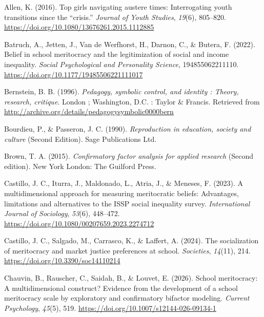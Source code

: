\documentclass[
  11pt,
]{article}
\newlength{\cslhangindent}
\newenvironment{CSLReferences}[2] %
 {\begin{list}{}{%
  \setlength{\itemindent}{0pt}
  \setlength{\leftmargin}{0pt}
  \setlength{\parsep}{0pt}
  \ifodd #1
   \setlength{\leftmargin}{\cslhangindent}
   \setlength{\itemindent}{-1\cslhangindent}
  \fi
  \setlength{\itemsep}{#2\baselineskip}}}
 {\end{list}}
\begin{document}
\label{refs}
\begin{CSLReferences}{1}{0}
Allen, K. (2016). Top girls navigating austere times: Interrogating
youth transitions since the {``crisis.''} \emph{Journal of Youth
Studies}, \emph{19}(6), 805--820.
\url{https://doi.org/10.1080/13676261.2015.1112885}

Batruch, A., Jetten, J., Van de Werfhorst, H., Darnon, C., \& Butera, F.
(2022). Belief in school meritocracy and the legitimization of social
and income inequality. \emph{Social Psychological and Personality
Science}, 194855062211110.
\url{https://doi.org/10.1177/19485506221111017}

Bernstein, B. B. (1996). \emph{Pedagogy, symbolic control, and identity
: Theory, research, critique}. London ; Washington, D.C. : Taylor \&
Francis. Retrieved from
\url{http://archive.org/details/pedagogysymbolic0000bern}

Bourdieu, P., \& Passeron, J. C. (1990). \emph{Reproduction in
education, society and culture} (Second Edition). Sage Publications Ltd.

Brown, T. A. (2015). \emph{Confirmatory factor analysis for applied
research} (Second edition). New York London: The Guilford Press.

Castillo, J. C., Iturra, J., Maldonado, L., Atria, J., \& Meneses, F.
(2023). A multidimensional approach for measuring meritocratic beliefs:
Advantages, limitations and alternatives to the ISSP social inequality
survey. \emph{International Journal of Sociology}, \emph{53}(6),
448--472. \url{https://doi.org/10.1080/00207659.2023.2274712}

Castillo, J. C., Salgado, M., Carrasco, K., \& Laffert, A. (2024). The
socialization of meritocracy and market justice preferences at school.
\emph{Societies}, \emph{14}(11), 214.
\url{https://doi.org/10.3390/soc14110214}

Chauvin, B., Rauscher, C., Saidah, B., \& Louvet, E. (2026). School
meritocracy: A multidimensional construct? Evidence from the development
of a school meritocracy scale by exploratory and confirmatory bifactor
modeling. \emph{Current Psychology}, \emph{45}(5), 519.
\url{https://doi.org/10.1007/s12144-026-09134-1}


\end{CSLReferences}
\end{document}
